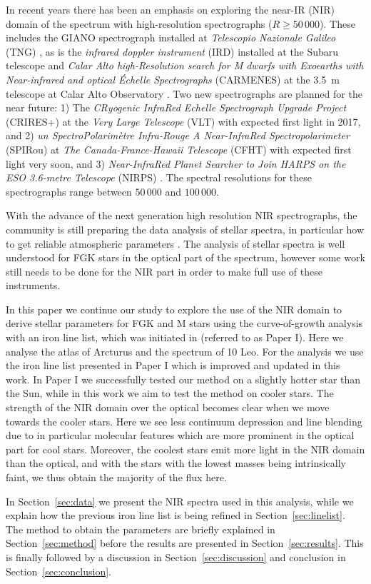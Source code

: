 \documentclass{aa}
\begin{document}
{In recent years there has been an emphasis on exploring the near-IR (NIR) domain of the spectrum
with high-resolution spectrographs ($R\ge50\,000$). These includes the GIANO spectrograph installed
at \emph{Telescopio Nazionale Galileo} (TNG) \citep{GIANO}, as is the \emph{infrared doppler
instrument} (IRD) installed at the Subaru telescope \citep{IRD} and \emph{Calar Alto high-Resolution
search for M dwarfs with Exoearths with Near-infrared and optical Échelle Spectrographs} (CARMENES)
at the \SI{3.5}{m} telescope at Calar Alto Observatory \citep{CARMENES}. Two new spectrographs are
planned for the near future: 1) The \emph{CRyogenic InfraRed Echelle Spectrograph Upgrade Project}
(CRIRES+) at the \emph{Very Large Telescope} (VLT) \citep{CRIRESp} with expected first light in
2017, and 2) \emph{un SpectroPolarimètre Infra-Rouge A Near-InfraRed Spectropolarimeter} (SPIRou) at
\emph{The Canada-France-Hawaii Telescope} (CFHT) \citep{SPIROU1,SPIROU2} with expected first light
very soon, and 3) \emph{ Near-InfraRed Planet Searcher to Join HARPS on the ESO 3.6-metre Telescope}
(NIRPS) \citep{Bouchy2017}. The spectral resolutions for these spectrographs range between $50\,000$
and $100\,000$.

With the advance of the next generation high resolution NIR spectrographs, the community is still
preparing the data analysis of stellar spectra, in particular how to get reliable atmospheric
parameters \citep[see e.g.][]{Onehag2012,Lindgren2016,Andreasen2016,Passegger2016}. The analysis of
stellar spectra is well understood for FGK stars in the optical part of the spectrum, however some
work still needs to be done for the NIR part in order to make full use of these instruments.

In this paper we continue our study to explore the use of the NIR domain to derive stellar
parameters for FGK and M stars using the curve-of-growth analysis with an iron line list, which was
initiated in \citet{Andreasen2016} (referred to as Paper I). Here we analyse the atlas of Arcturus
and the spectrum of 10 Leo. For the analysis we use the iron line list presented in Paper I which is
improved and updated in this work. In Paper I we successfully tested our method on a slightly hotter
star than the Sun, while in this work we aim to test the method on cooler stars. The strength of the
NIR domain over the optical becomes clear when we move towards the cooler stars. Here we see less
continuum depression and line blending due to in particular molecular features which are more
prominent in the optical part for cool stars. Moreover, the coolest stars emit more light in the NIR
domain than the optical, and with the stars with the lowest masses being intrinsically faint, we
thus obtain the majority of the flux here.

In Section~\ref{sec:data} we present the NIR spectra used in this analysis, while we explain how the
previous iron line list is being refined in Section~\ref{sec:linelist}. The method to obtain the
parameters are briefly explained in Section~\ref{sec:method} before the results are presented in
Section~\ref{sec:results}. This is finally followed by a discussion in Section~\ref{sec:discussion}
and conclusion in Section~\ref{sec:conclusion}.
}
\end{document}
